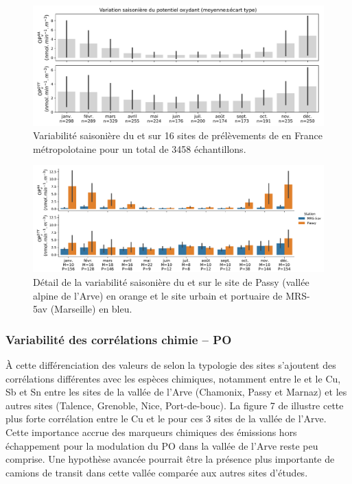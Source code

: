 \begin{figure}[ht]
    \centering
    \includegraphics[width=1.0\linewidth]{figures/chapter04/variabilite_saisonniere.pdf}
    \caption{Variabilité saisonière du \POAAv{} et \PODTTv{} sur 16 sites de prélèvements
        de \PMdix{} en France métropolotaine pour un total de 3458 échantillons.
    }%
    \label{fig:variabilite_saisonniere}
\end{figure}


\begin{figure}[ht]
    \centering
    \includegraphics[width=1.0\linewidth]{figures/chapter04/variabilite_saisonniere_MRS-Passy.pdf}
    \caption{Détail de la variabilité saisonière du \POAAv{} et \PODTTv{} sur le site de
        Passy (vallée alpine de l'Arve) en orange et le site urbain et portuaire de MRS-5av
        (Marseille) en bleu.
    }%
    \label{fig:variabilite_saisonniere_MRS_PASSY}
\end{figure}

\subsubsection{Variabilité des corrélations chimie -- PO}%
\label{ssub:_variabilité_des_corrélations_chimie_po}

À cette différenciation des valeurs de \POv{} selon la typologie des sites s'ajoutent des
corrélations différentes avec les espèces chimiques, notamment entre le \POAAv{} et le
Cu, Sb et Sn entre les sites de la vallée de l'Arve (Chamonix, Passy et Marnaz) et les
autres sites (Talence, Grenoble, Nice, Port-de-bouc). La figure 7 de
\cite{calasSeasonal2019} illustre cette plus forte corrélation entre le Cu et le \POAAv{}
pour ces 3 sites de la vallée de l'Arve. Cette importance accrue des marqueurs chimiques des
émissions hors échappement pour la modulation du PO dans la vallée de l'Arve reste peu
comprise. Une hypothèse avancée pourrait être la présence plus importante de camions de
transit dans cette vallée comparée aux autres sites d'études.

